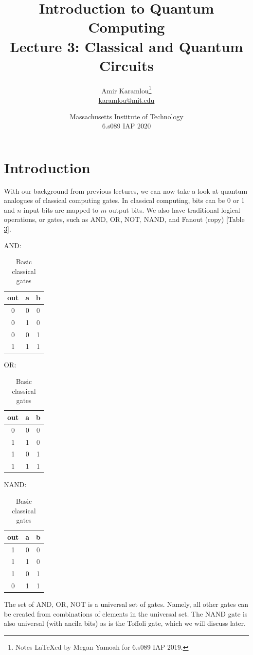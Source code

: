 \documentclass[11pt]{article} %
\author{Amir Karamlou\footnote{Notes LaTeXed by Megan Yamoah for 6.s089 IAP 2019.}\\\href{mailto:karamlou@mit.edu}{karamlou@mit.edu}}
\title{Introduction to Quantum Computing\\Lecture 3: Classical and Quantum Circuits}
\date{Massachusetts Institute of Technology\\6.s089 IAP 2020}
\begin{document}
\maketitle
\newpage
\tableofcontents
\newpage


\section{Introduction}
With our background from previous lectures, we can now take a look at quantum analogues of classical computing gates. In classical computing, bits can be 0 or 1 and $n$ input bits are mapped to $m$ output bits. We also have traditional logical operations, or gates, such as AND, OR, NOT, NAND, and Fanout (copy) [Table \ref{basic_gates}].

\begin{table}[h!]
    \centering
    AND: 
    \begin{tabular}{c|c c}
        out & a & b\\\hline
        0 & 0 & 0\\
        0 & 1 & 0\\
        0 & 0 & 1\\
        1 & 1 & 1\\
    \end{tabular}\;\;
    OR: 
    \begin{tabular}{c|c c}
        out & a & b\\\hline
        0 & 0 & 0\\
        1 & 1 & 0\\
        1 & 0 & 1\\
        1 & 1 & 1\\
    \end{tabular}\;\;
    NAND: 
    \begin{tabular}{c|c c}
        out & a & b\\\hline
        1 & 0 & 0\\
        1 & 1 & 0\\
        1 & 0 & 1\\
        0 & 1 & 1\\
    \end{tabular}
    \caption{Basic classical gates}
    \label{basic_gates}
\end{table}

The set of {AND, OR, NOT} is a universal set of gates. Namely, all other gates can be created from combinations of elements in the universal set. The NAND gate is also universal (with ancila bits) as is the Toffoli gate, which we will discuss later.
\end{document}
